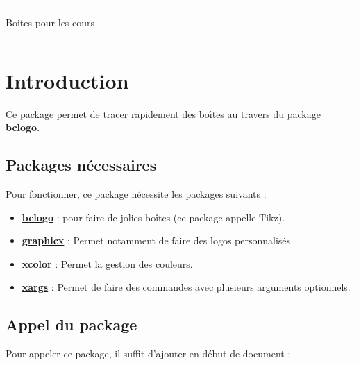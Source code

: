 \documentclass[a4paper,12pt]{article}
\begin{document}
	\begin{center}
		\hrule{\Large Boites pour les cours}\\\hrule
	\end{center}

	\tableofcontents
	\newcommand{\sectionbreak}{\newpage}


\newenvironment{ttt}{\begin{center}}{\end{center}}




	\section{Introduction}

		Ce package permet de tracer rapidement des boîtes au travers du package \textbf{bclogo}.

		\subsection{Packages nécessaires}

		Pour fonctionner, ce package nécessite les packages suivants :
		\begin{itemize}
			\item \href{http://melusine.eu.org/syracuse/G/bclogo/dev/latex/}{\textbf{bclogo}} : pour faire de jolies boîtes (ce package appelle Tikz). %
			\item \href{http://ctan.org/pkg/graphicx}{\textbf{graphicx}} : Permet notamment de faire des logos personnalisés
			\item \href{http://www.ctan.org/tex-archive/macros/latex/contrib/xcolor}{\textbf{xcolor}} : Permet la gestion des couleurs.
			\item \href{http://www.ctan.org/tex-archive/macros/latex/contrib/xargs}{\textbf{xargs}} : Permet de faire des commandes avec plusieurs arguments optionnels.
		\end{itemize}

		\subsection{Appel du package}

		Pour appeler ce package, il suffit d'ajouter en début de document :
\end{document}
